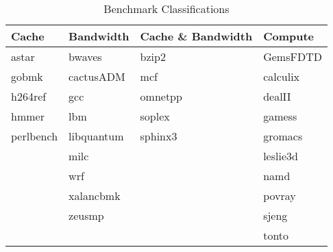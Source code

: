 \begin{table}[ht]
\centering
\begin{tabular}{llll}
\toprule
\bf{Cache} & \bf{Bandwidth} & \bf{Cache \& Bandwidth} & \bf{Compute} \\ \hline
astar	& bwaves	& bzip2	& GemsFDTD	\\ 
gobmk	& cactusADM	& mcf	& calculix	\\ 
h264ref	& gcc	& omnetpp	& dealII	\\ 
hmmer	& lbm	& soplex	& gamess	\\ 
perlbench	& libquantum	& sphinx3	& gromacs	\\ 
		& milc	& 		& leslie3d	\\ 
		& wrf	& 		& namd	\\ 
		& xalancbmk	& 		& povray	\\ 
		& zeusmp	& 		& sjeng	\\ 
		& 		& 		& tonto	\\ 
\bottomrule
\end{tabular}
\caption{Benchmark Classifications}
\label{tbl:benchmarks_workloads:benchmark_classification}
\end{table}
